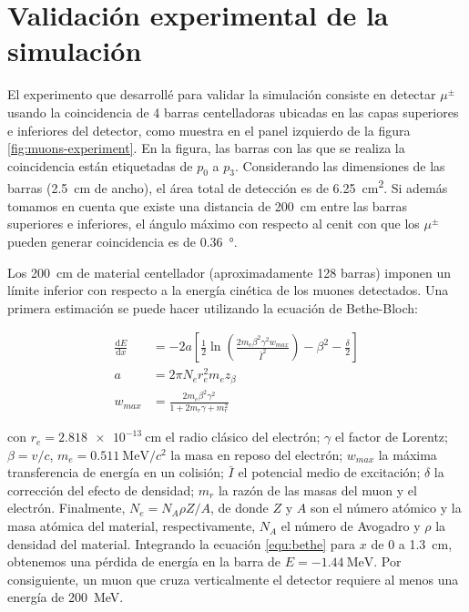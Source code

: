 \section{Validación experimental de la simulación}

El experimento que desarrollé para validar la simulación consiste en detectar $\mu^{\pm}$ usando la coincidencia de \num{4} barras centelladoras ubicadas en las capas superiores e inferiores del detector, como muestra en el panel izquierdo de la figura \ref{fig:muons-experiment}. En la figura, las barras con las que se realiza la coincidencia están etiquetadas de $p_{0}$ a $p_{3}$. Considerando las dimensiones de las barras (\SI{2.5}{\cm} de ancho), el área total de detección es de \SI{6.25}{\cm\squared}. Si además tomamos en cuenta que existe una distancia de \SI{200}{\cm} entre las barras superiores e inferiores, el ángulo máximo con respecto al cenit   con que los $\mu^{\pm}$ pueden generar coincidencia es de \SI{0.36}{\degree}.

Los \SI{200}{\cm} de material centellador (aproximadamente \num{128} barras) imponen un límite inferior con respecto a la energía cinética de los muones detectados. Una primera estimación se puede hacer utilizando la ecuación de Bethe-Bloch:

\begin{align}
\label{equ:bethe}
\frac{\mathrm{d}E}{\mathrm{d}x} &=-2a\left[\frac{1}{2}\ln\left(\frac{2m_{e}\beta^{2}\gamma^{2}w_{max}}{\bar{I}^{2}}\right)-\beta^{2}-\frac{\delta}{2}\right] \\
a &=2\pi N_{e}r_{e}^{2}m_{e}z_{\beta}  \nonumber \\
w_{max} &=\frac{2m_{e}\beta^{2}\gamma^{2}}{1+2m_{r}\gamma+m_{r}^{2}} \nonumber
\end{align}

con $r_{e}=\SI{2.818e-13}{\cm}$ el radio clásico del electrón; $\gamma$ el factor de Lorentz; $\beta=v/c$, $m_{e}=\SI{0.511}{\mega\electronvolt\per c^{2}}$ la masa en reposo del electrón; $w_{max}$ la máxima transferencia de energía en un colisión; $\bar{I}$ el potencial medio de excitación; $\delta$ la corrección del efecto de densidad; $m_{r}$ la razón de las masas del muon y el electrón. Finalmente, $N_{e}=N_{A}\rho Z/A$, de donde $Z$ y $A$ son el número atómico y la masa atómica del material, respectivamente, $N_{A}$ el número de Avogadro y $\rho$ la densidad del material. Integrando la ecuación \ref{equ:bethe} para $x$ de \num{0} a \SI{1.3}{\cm}, obtenemos una pérdida de energía en la barra de $E=\SI{-1.44}{\mega\electronvolt}$. Por consiguiente, un muon que cruza verticalmente el detector requiere al menos una energía de \SI{200}{\mega\electronvolt}.

